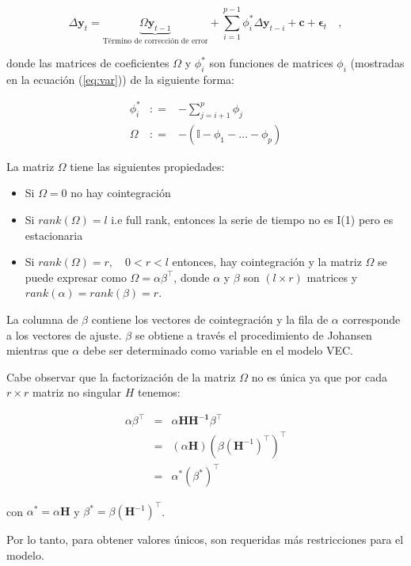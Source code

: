 \begin{equation}
 \label{eq:vec}
 \Delta \mathbf{y}_t = 
 \underbrace{ \Omega\mathbf{y}_{t-1}}_\text{Término de corrección de error} + 
 \sum_{i=1}^{p-1}
 \phi_i^* \Delta \mathbf{y}_{t-i}  + \mathbf{c} + \mathbf{\epsilon}_t \quad ,
\end{equation}

\noindent donde las matrices de coeficientes $\Omega$ y $\phi_i^*$ son
funciones de matrices $\phi_i$ (mostradas en la ecuación (\ref{eq:var})) de
la siguiente forma:

\begin{eqnarray*}
\phi_i^* &: =& -\sum_{j=i+1}^{p} \phi_j \\
\Omega &: =& -(\mathbb{I}-\phi_1-\dots-\phi_p) 
\end{eqnarray*}

La matriz $\Omega$ tiene las siguientes propiedades:
\begin{itemize}
\item Si $\Omega = 0$ no hay cointegración 
\item Si $rank(\Omega)=l$ i.e full rank, entonces la serie de tiempo no es I(1) pero es estacionaria
\item Si $rank(\Omega)=r,\quad 0 < r < l$ entonces, hay cointegración 
y la matriz $\Omega$ se puede expresar como $\Omega =
\alpha \beta^\intercal$, donde $\alpha$ y $\beta$ son $(l \times r)$
matrices y $rank(\alpha)=rank(\beta)=r$.
\end{itemize}

La columna de $\beta$ contiene los vectores de cointegración y la fila de
$\alpha$ corresponde a los vectores de ajuste. $\beta$ se obtiene a través
el procedimiento de Johansen~\cite{johansen1988} mientras que $\alpha$ debe
ser determinado como variable en el modelo VEC.

Cabe observar que la factorización de la matriz $\Omega$ no es única ya que por cada
$r \times r$ matriz no singular $H$ tenemos:

\begin{eqnarray*}
\alpha \beta^\intercal &=& \alpha \mathbf{HH^{-1}} \beta^\intercal\\
&=&(\alpha\mathbf{H})(\beta(\mathbf{H}^{-1})^\intercal)^\intercal \\
&=& \alpha^*(\beta^*)^\intercal
\end{eqnarray*}

\noindent con $\alpha^* = \alpha\mathbf{H}$ y $\beta^* =
\beta(\mathbf{H}^{-1})^\intercal$.

Por lo tanto, para obtener valores únicos, son requeridas más restricciones
para el modelo.


